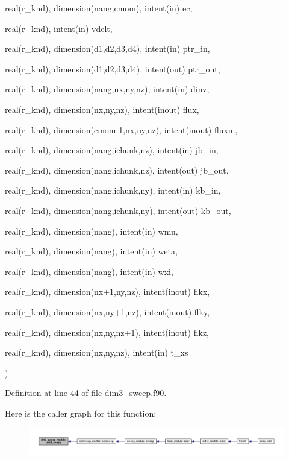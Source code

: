 {{\begin{DoxyParamCaption}
\item[{real(r\-\_\-knd), dimension(nang,cmom), intent(in)}]{ec, }
\item[{real(r\-\_\-knd), intent(in)}]{vdelt, }
\item[{real(r\-\_\-knd), dimension(d1,d2,d3,d4), intent(in)}]{ptr\-\_\-in, }
\item[{real(r\-\_\-knd), dimension(d1,d2,d3,d4), intent(out)}]{ptr\-\_\-out, }
\item[{real(r\-\_\-knd), dimension(nang,nx,ny,nz), intent(in)}]{dinv, }
\item[{real(r\-\_\-knd), dimension(nx,ny,nz), intent(inout)}]{flux, }
\item[{real(r\-\_\-knd), dimension(cmom-\/1,nx,ny,nz), intent(inout)}]{fluxm, }
\item[{real(r\-\_\-knd), dimension(nang,ichunk,nz), intent(in)}]{jb\-\_\-in, }
\item[{real(r\-\_\-knd), dimension(nang,ichunk,nz), intent(out)}]{jb\-\_\-out, }
\item[{real(r\-\_\-knd), dimension(nang,ichunk,ny), intent(in)}]{kb\-\_\-in, }
\item[{real(r\-\_\-knd), dimension(nang,ichunk,ny), intent(out)}]{kb\-\_\-out, }
\item[{real(r\-\_\-knd), dimension(nang), intent(in)}]{wmu, }
\item[{real(r\-\_\-knd), dimension(nang), intent(in)}]{weta, }
\item[{real(r\-\_\-knd), dimension(nang), intent(in)}]{wxi, }
\item[{real(r\-\_\-knd), dimension(nx+1,ny,nz), intent(inout)}]{flkx, }
\item[{real(r\-\_\-knd), dimension(nx,ny+1,nz), intent(inout)}]{flky, }
\item[{real(r\-\_\-knd), dimension(nx,ny,nz+1), intent(inout)}]{flkz, }
\item[{real(r\-\_\-knd), dimension(nx,ny,nz), intent(in)}]{t\-\_\-xs}
\end{DoxyParamCaption}
)}}\label{classdim3__sweep__module_a201ea00518f54fac4152d4ce277de50d}


Definition at line 44 of file dim3\-\_\-sweep.\-f90.



Here is the caller graph for this function\-:\nopagebreak
\begin{figure}[H]
\begin{center}
\leavevmode
\includegraphics[width=350pt]{classdim3__sweep__module_a201ea00518f54fac4152d4ce277de50d_icgraph}
\end{center}
\end{figure}




